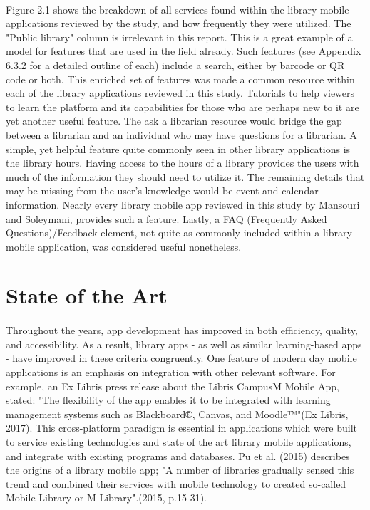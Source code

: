     \paragraph{}
    Figure 2.1 shows the breakdown of all services found within the library mobile applications reviewed by the study, and how frequently they were utilized. The "Public library" column is irrelevant in this report. This is a great example of a model for features that are used in the field already. Such features (see Appendix 6.3.2 for a detailed outline of each) include a search, either by barcode or QR code or both. This enriched set of features was made a common resource within each of the library applications reviewed in this study. Tutorials to help viewers to learn the platform and its capabilities for those who are perhaps new to it are yet another useful feature. The ask a librarian resource would bridge the gap between a librarian and an individual who may have questions for a librarian. A simple, yet helpful feature quite commonly seen in other library applications is the library hours. Having access to the hours of a library provides the users with much of the information they should need to utilize it. The remaining details that may be missing from the user's knowledge would be event and calendar information. Nearly every library mobile app reviewed in this study by Mansouri and Soleymani, provides such a feature. Lastly, a FAQ (Frequently Asked Questions)/Feedback element, not quite as commonly included within a library mobile application, was considered useful nonetheless.
     

\section{State of the Art}
    \paragraph{}
    Throughout the years, app development has improved in both efficiency, quality, and accessibility. As a result, library apps - as well as similar learning-based apps - have improved in these criteria congruently. One feature of modern day mobile applications is an emphasis on integration with other relevant software. For example, an Ex Libris press release about the Libris CampusM Mobile App, stated: "The flexibility of the app enables it to be integrated with learning management systems such as Blackboard®, Canvas, and Moodle™"(Ex Libris, 2017). This cross-platform paradigm is essential in applications which were built to service existing technologies and state of the art library mobile applications, and integrate with existing programs and databases. Pu et al. (2015) describes the origins of a library mobile app; "A number of libraries gradually sensed this trend and combined their services with mobile technology to created so-called Mobile Library or M-Library".(2015, p.15-31).
